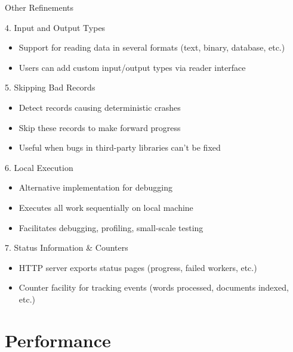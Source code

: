 \documentclass[aspectratio=169]{beamer}
\begin{document}
\begin{frame}{Other Refinements}
\begin{block}{4. Input and Output Types}
\begin{itemize}
    \item Support for reading data in several formats (text, binary, database, etc.)
    \item Users can add custom input/output types via reader interface
\end{itemize}
\end{block}

\begin{block}{5. Skipping Bad Records}
\begin{itemize}
    \item Detect records causing deterministic crashes
    \item Skip these records to make forward progress
    \item Useful when bugs in third-party libraries can't be fixed
\end{itemize}
\end{block}

\begin{block}{6. Local Execution}
\begin{itemize}
    \item Alternative implementation for debugging
    \item Executes all work sequentially on local machine
    \item Facilitates debugging, profiling, small-scale testing
\end{itemize}
\end{block}

\begin{block}{7. Status Information \& Counters}
\begin{itemize}
    \item HTTP server exports status pages (progress, failed workers, etc.)
    \item Counter facility for tracking events (words processed, documents indexed, etc.)
\end{itemize}
\end{block}
\end{frame}

\section{Performance}
\end{document}
